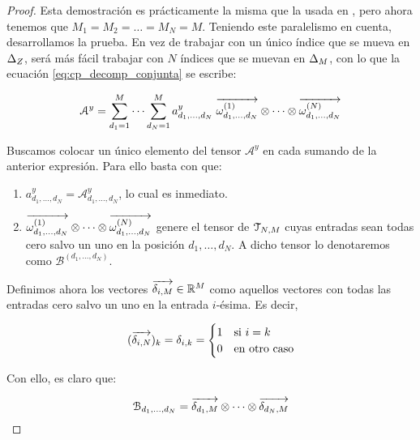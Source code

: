 \begin{proof}

	Esta demostración es prácticamente la misma que la usada en , pero ahora tenemos que $M_1 = M_2 = \ldots = M_N = M$. Teniendo este paralelismo en cuenta, desarrollamos la prueba. En vez de trabajar con un único índice que se mueva en $\Delta_{Z}$, será más fácil trabajar con $N$ índices que se muevan en $\Delta_{M}$, con lo que la ecuación \eqref{eq:cp_decomp_conjunta} se escribe:

    \begin{equation}
        \mathcal{A}^y = \sum_{d_1 = 1}^{M} \cdots \sum_{d_N = 1}^{M} a^y_{d_1, \ldots, d_N} \; \overrightarrow{\omega^{(1)}_{d_1, \ldots, d_N}} \otimes \cdots \otimes \overrightarrow{\omega^{(N)}_{d_1, \ldots, d_N}}
    \end{equation}

    Buscamos colocar un único elemento del tensor $\mathcal{A}^y$ en cada sumando de la anterior expresión. Para ello basta con que:

    \begin{enumerate}
        \item $a^y_{d_1, \ldots, d_N} = \mathcal{A}^y_{d_1, \ldots, d_N}$, lo cual es inmediato.
        \item $\overrightarrow{\omega^{(1)}_{d_1, \ldots, d_N}} \otimes \cdots \otimes \overrightarrow{\omega^{(N)}_{d_1, \ldots, d_N}}$ genere el tensor de $\mathcal{T}_{N, M}$ cuyas entradas sean todas cero salvo un uno en la posición $d_1, \ldots, d_N$. A dicho tensor lo denotaremos como $\mathcal{B}^{(d_1, \ldots, d_N)}$.
    \end{enumerate}

    Definimos ahora los vectores $\overrightarrow{\delta_{i, M}} \in \mathbb{R}^M$ como aquellos vectores con todas las entradas cero salvo un uno en la entrada $i$-ésima. Es decir,

    \begin{equation}
        (\overrightarrow{\delta_{i, N}})_k = \delta_{i, k} =
        \begin{cases}
            1 & \text{si } i = k    \\
            0 & \text{en otro caso}
        \end{cases}
    \end{equation}

    Con ello, es claro que:

    \begin{equation}
        \mathcal{B}_{d_1, \ldots, d_N} = \overrightarrow{\delta_{d_1, M}} \otimes \cdots \otimes \overrightarrow{\delta_{d_N, M}}
    \end{equation}


\end{proof}
